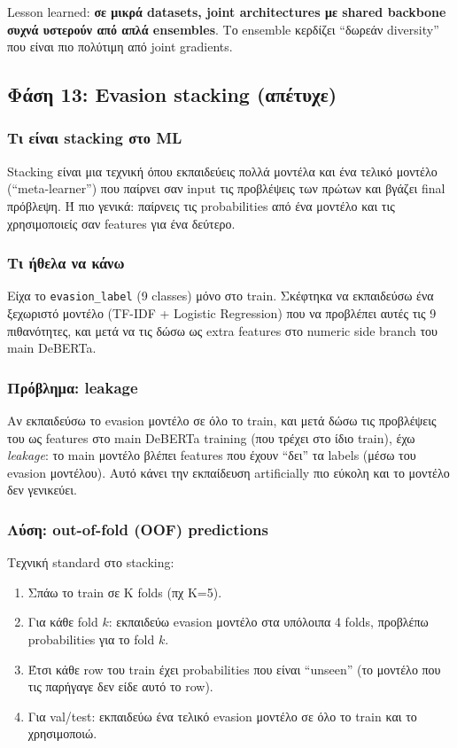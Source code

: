 \documentclass[12pt]{fphw}
\begin{document}
Lesson learned: \textbf{σε μικρά datasets, joint architectures με shared backbone συχνά υστερούν από απλά ensembles}. Το ensemble κερδίζει ``δωρεάν diversity'' που είναι πιο πολύτιμη από joint gradients.

\subsection{Φάση 13: Evasion stacking (απέτυχε)}

\subsubsection{Τι είναι stacking στο ML}

Stacking είναι μια τεχνική όπου εκπαιδεύεις πολλά μοντέλα και ένα τελικό μοντέλο (``meta-learner'') που παίρνει σαν input τις προβλέψεις των πρώτων και βγάζει final πρόβλεψη. Ή πιο γενικά: παίρνεις τις probabilities από ένα μοντέλο και τις χρησιμοποιείς σαν features για ένα δεύτερο.

\subsubsection{Τι ήθελα να κάνω}

Είχα το \texttt{evasion\_label} (9 classes) μόνο στο train. Σκέφτηκα να εκπαιδεύσω ένα ξεχωριστό μοντέλο (TF-IDF + Logistic Regression) που να προβλέπει αυτές τις 9 πιθανότητες, και μετά να τις δώσω ως extra features στο numeric side branch του main DeBERTa.

\subsubsection{Πρόβλημα: leakage}

Αν εκπαιδεύσω το evasion μοντέλο σε όλο το train, και μετά δώσω τις προβλέψεις του ως features στο main DeBERTa training (που τρέχει στο ίδιο train), έχω \emph{leakage}: το main μοντέλο βλέπει features που έχουν ``δει'' τα labels (μέσω του evasion μοντέλου). Αυτό κάνει την εκπαίδευση artificially πιο εύκολη και το μοντέλο δεν γενικεύει.

\subsubsection{Λύση: out-of-fold (OOF) predictions}

Τεχνική standard στο stacking:

\begin{enumerate}
    \item Σπάω το train σε K folds (πχ K=5).
    \item Για κάθε fold $k$: εκπαιδεύω evasion μοντέλο στα υπόλοιπα 4 folds, προβλέπω probabilities για το fold $k$.
    \item Έτσι κάθε row του train έχει probabilities που είναι ``unseen'' (το μοντέλο που τις παρήγαγε δεν είδε αυτό το row).
    \item Για val/test: εκπαιδεύω ένα τελικό evasion μοντέλο σε όλο το train και το χρησιμοποιώ.
\end{enumerate}
\end{document}
